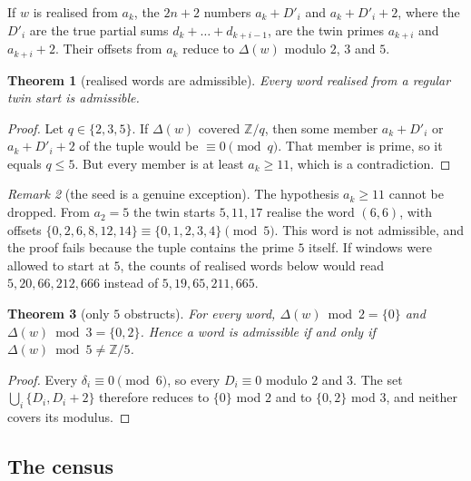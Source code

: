 \documentclass[11pt]{article}
\newcommand{\Z}{\mathbb Z}
\theoremstyle{plain}
\newtheorem{theorem}{Theorem}
\theoremstyle{definition}
\theoremstyle{remark}
\newtheorem{remark}[theorem]{Remark}
\begin{document}
If $w$ is realised from $a_k$, the $2n+2$ numbers $a_k+D'_i$ and $a_k+D'_i+2$, where the $D'_i$
are the true partial sums $d_k+\dots+d_{k+i-1}$, are the twin primes $a_{k+i}$ and $a_{k+i}+2$. Their
offsets from $a_k$ reduce to $\Delta(w)$ modulo $2$, $3$ and $5$.

\begin{theorem}[realised words are admissible]\label{thm:realised}
Every word realised from a regular twin start is admissible.
\end{theorem}
\begin{proof}
Let $q\in\{2,3,5\}$. If $\Delta(w)$ covered $\Z/q$, then some member $a_k+D'_i$ or $a_k+D'_i+2$
of the tuple would be $\equiv0\pmod q$. That member is prime, so it equals $q\le5$. But every
member is at least $a_k\ge11$, which is a contradiction.
\end{proof}

\begin{remark}[the seed is a genuine exception]\label{rem:seed}
The hypothesis $a_k\ge 11$ cannot be dropped. From $a_2=5$ the twin starts $5,11,17$ realise the
word $(6,6)$, with offsets $\{0,2,6,8,12,14\}\equiv\{0,1,2,3,4\}\pmod 5$. This word is not
admissible, and the proof fails because the tuple contains the prime $5$ itself. If windows were
allowed to start at $5$, the counts of realised words below would read $5,20,66,212,666$ instead of
$5,19,65,211,665$.
\end{remark}

\begin{theorem}[only $5$ obstructs]\label{thm:obstruct}
For every word, $\Delta(w)\bmod 2=\{0\}$ and $\Delta(w)\bmod 3=\{0,2\}$. Hence a word is admissible
if and only if $\Delta(w)\bmod 5\ne\Z/5$.
\end{theorem}
\begin{proof}
Every $\delta_i\equiv0\pmod 6$, so every $D_i\equiv0$ modulo $2$ and $3$. The set
$\bigcup_i\{D_i,D_i+2\}$ therefore reduces to $\{0\}$ mod $2$ and to $\{0,2\}$ mod $3$, and neither
covers its modulus.
\end{proof}

\subsection{The census}
\end{document}
